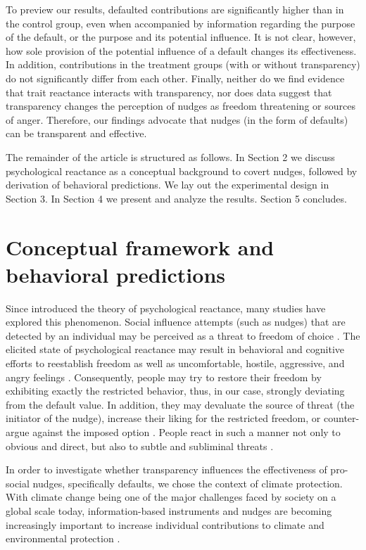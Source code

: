 \documentclass[review, authoryear,12pt]{elsarticle}
\begin{document}
To preview our results, defaulted contributions are significantly higher than in the control group, even when accompanied by information regarding the purpose of the default, or the purpose and its potential influence. It is not clear, however, how sole provision of the potential influence of a default changes its effectiveness. In addition, contributions in the treatment groups (with or without transparency) do not significantly differ from each other. Finally, neither do we find evidence that trait reactance interacts with transparency, nor does data suggest that transparency changes the perception of nudges as freedom threatening or sources of anger. Therefore, our findings advocate that nudges (in the form of defaults) can be transparent and effective.

The remainder of the article is structured as follows. In Section 2 we discuss psychological reactance as a conceptual background to covert nudges, followed by derivation of behavioral predictions. We lay out the experimental design in Section 3. In Section 4 we present and analyze the results. Section 5 concludes. 

\section{Conceptual framework and behavioral predictions}
Since \cite{Brehm.1966} introduced the theory of psychological reactance, many studies have explored this phenomenon. Social influence attempts (such as nudges) that are detected by an individual may be perceived as a threat to freedom of choice \citep{Brehm.1966}. The elicited state of psychological reactance may result in behavioral and cognitive efforts to reestablish freedom as well as uncomfortable, hostile, aggressive, and angry feelings \citep{Dillard.2005}. Consequently, people may try to restore their freedom by exhibiting exactly the restricted behavior, thus, in our case, strongly deviating from the default value. In addition, they may devaluate the source of threat (the initiator of the nudge), increase their liking for the restricted freedom, or counter-argue against the imposed option \citep{Brehm.1966, Dillard.2005}. People react in such a manner not only to obvious and direct, but also to subtle and subliminal threats \citep{Chartrand.2007}.

In order to investigate whether transparency influences the effectiveness of pro-social nudges, specifically defaults, we chose the context of climate protection. With climate change being one of the major challenges faced by society on a global scale today, information-based instruments and nudges are becoming increasingly important to increase individual contributions to climate and environmental protection \citep{Allcott.2010, Arana.2013, WorldBank.2015}.
\end{document}
